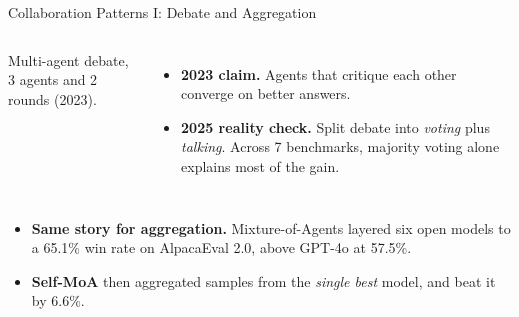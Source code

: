 \begin{frame}{Collaboration Patterns I: Debate and Aggregation}
\begin{columns}[T,onlytextwidth]
        \vspace{0.4em}
        {\footnotesize Multi-agent debate, 3 agents and 2 rounds (2023).}
        \begin{itemize}\itemsep0.4em
            \item \textbf{2023 claim.} Agents that critique each other converge on better answers.
            \item \textbf{2025 reality check.} Split debate into \emph{voting} plus \emph{talking}. Across 7 benchmarks, majority voting alone explains most of the gain.
        \end{itemize}
    \end{columns}
    \vspace{0.5em}
    \begin{itemize}\itemsep0.4em
        \item \textbf{Same story for aggregation.} Mixture-of-Agents layered six open models to a 65.1\% win rate on AlpacaEval 2.0, above GPT-4o at 57.5\%.
        \item \textbf{Self-MoA} then aggregated samples from the \emph{single best} model, and beat it by 6.6\%.
    \end{itemize}
\end{frame}

